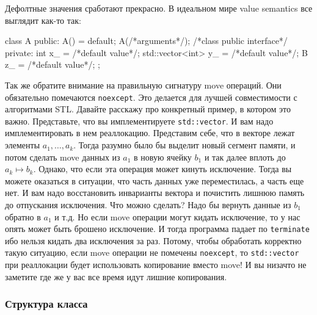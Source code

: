 Дефолтные значения сработают прекрасно.
В идеальном мире value semantics все выглядит как-то так:
\begin{cppcode}
class A {
public:
  A() = default;
  A(/*arguments*/);
  /*class public interface*/
private:
  int x_ = /*default value*/;
  std::vector<int> y_ = /*default value*/;
  B z_ = /*default value*/;
};
\end{cppcode}
Так же обратите внимание на правильную сигнатуру move операций.
Они обязательно помечаются \verb"noexcept".
Это делается для лучшей совместимости с алгоритмами STL.
Давайте расскажу про конкретный пример, в котором это важно.
Представьте, что вы имплементируете \verb"std::vector".
И вам надо имплементировать в нем реаллокацию.
Представим себе, что в векторе лежат элементы $a_1,\ldots, a_k$.
Тогда разумно было бы выделит новый сегмент памяти, и потом сделать move данных из $a_1$ в новую ячейку $b_1$ и так далее вплоть до $a_k\mapsto b_k$.
Однако, что если эта операция может кинуть исключение.
Тогда вы можете оказаться в ситуации, что часть данных уже переместилась, а часть еще нет.
И вам надо восстановить инварианты вектора и почистить лишнюю память до отпускания исключения.
Что можно сделать?
Надо бы вернуть данные из $b_1$ обратно в $a_1$ и т.д.
Но если move операции могут кидать исключение, то у нас опять может быть брошено исключение.
И тогда программа падает по \verb"terminate" ибо нельзя кидать два исключения за раз.
Потому, чтобы обработать корректно такую ситуацию, если move операции не помечены \verb"noexcept", то \verb"std::vector" при реаллокации будет использовать копирование вместо move!
И вы низачто не заметите где же у вас все время идут лишние копирования.

\subsubsection{Структура класса}


